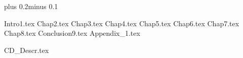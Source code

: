 \documentclass[11pt,twoside,a4paper]{book}
\begin{document}

\mainbodystarts
\normalfont
{}\baselineskip plus 0.2\baselineskip minus 0.1\baselineskip
% 

% 
%

{Intro1.tex}
{Chap2.tex}
{Chap3.tex}
{Chap4.tex}
{Chap5.tex}
{Chap6.tex}
{Chap7.tex}
{Chap8.tex}
{Conclusion9.tex}
{Appendix_1.tex}

{
\def\CS{$\cal C\kern-0.1667em\lower.5ex\hbox{$\cal S$}\kern-0.075em $}

}

{CD_Descr.tex}

\end{document}
